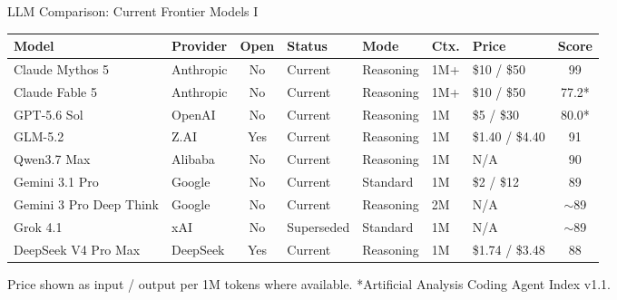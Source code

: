 \begin{frame}[shrink=5]{LLM Comparison: Current Frontier Models I}
\centering
\scriptsize
\begin{tabular}{p{3.0cm} p{1.6cm} c p{1.6cm} p{1.5cm} p{1.2cm} p{1.8cm} c}
\toprule
\textbf{Model} & \textbf{Provider} & \textbf{Open} & \textbf{Status} & \textbf{Mode} & \textbf{Ctx.} & \textbf{Price} & \textbf{Score} \\
\midrule
Claude Mythos 5 & Anthropic & No & Current & Reasoning & 1M+ & \$10 / \$50 & 99 \\
Claude Fable 5 & Anthropic & No & Current & Reasoning & 1M+ & \$10 / \$50 & 77.2* \\
GPT-5.6 Sol & OpenAI & No & Current & Reasoning & 1M & \$5 / \$30 & 80.0* \\
GLM-5.2 & Z.AI & Yes & Current & Reasoning & 1M & \$1.40 / \$4.40 & 91 \\
Qwen3.7 Max & Alibaba & No & Current & Reasoning & 1M & N/A & 90 \\
Gemini 3.1 Pro & Google & No & Current & Standard & 1M & \$2 / \$12 & 89 \\
Gemini 3 Pro Deep Think & Google & No & Current & Reasoning & 2M & N/A & $\sim$89 \\
Grok 4.1 & xAI & No & Superseded & Standard & 1M & N/A & $\sim$89 \\
DeepSeek V4 Pro Max & DeepSeek & Yes & Current & Reasoning & 1M & \$1.74 / \$3.48 & 88 \\
\bottomrule
\end{tabular}

\vspace{0.4em}
{\tiny Price shown as input / output per 1M tokens where available. *Artificial Analysis Coding Agent Index v1.1.}
\end{frame}

